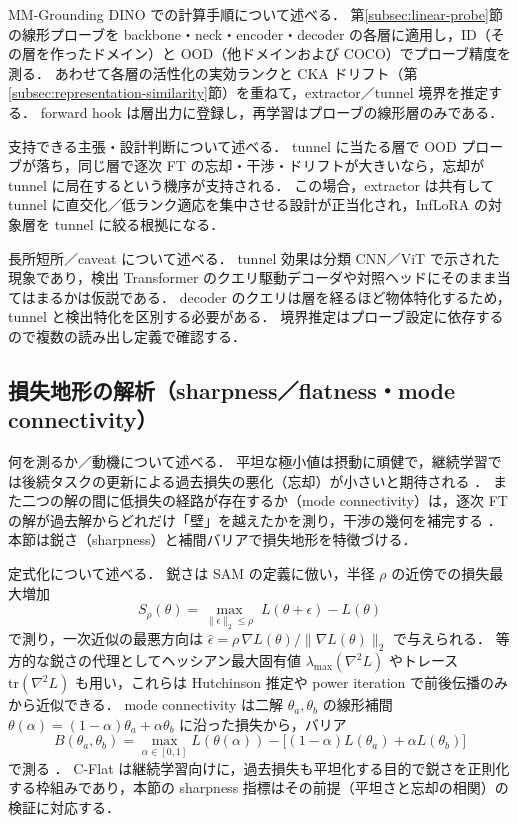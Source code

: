 MM-Grounding DINO での計算手順について述べる．
第\ref{subsec:linear-probe}節の線形プローブを backbone・neck・encoder・decoder の各層に適用し，ID（その層を作ったドメイン）と OOD（他ドメインおよび COCO）でプローブ精度を測る．
あわせて各層の活性化の実効ランクと CKA ドリフト（第\ref{subsec:representation-similarity}節）を重ねて，extractor／tunnel 境界を推定する．
forward hook は層出力に登録し，再学習はプローブの線形層のみである．

支持できる主張・設計判断について述べる．
tunnel に当たる層で OOD プローブが落ち，同じ層で逐次 FT の忘却・干渉・ドリフトが大きいなら，忘却が tunnel に局在するという機序が支持される．
この場合，extractor は共有して tunnel に直交化／低ランク適応を集中させる設計が正当化され，InfLoRA の対象層を tunnel に絞る根拠になる．

長所短所／caveat について述べる．
tunnel 効果は分類 CNN／ViT で示された現象であり，検出 Transformer のクエリ駆動デコーダや対照ヘッドにそのまま当てはまるかは仮説である．
decoder のクエリは層を経るほど物体特化するため，tunnel と検出特化を区別する必要がある．
境界推定はプローブ設定に依存するので複数の読み出し定義で確認する．


\subsection{損失地形の解析（sharpness／flatness・mode connectivity）}
\label{subsec:loss-landscape}

何を測るか／動機について述べる．
平坦な極小値は摂動に頑健で，継続学習では後続タスクの更新による過去損失の悪化（忘却）が小さいと期待される \cite{cflat}．
また二つの解の間に低損失の経路が存在するか（mode connectivity）は，逐次 FT の解が過去解からどれだけ「壁」を越えたかを測り，干渉の幾何を補完する \cite{lmc}．
本節は鋭さ（sharpness）と補間バリアで損失地形を特徴づける．

定式化について述べる．
鋭さは SAM \cite{sam_foret2021} の定義に倣い，半径 $\rho$ の近傍での損失最大増加
\begin{equation}
S_\rho(\theta) = \max_{\|\epsilon\|_2 \leq \rho}\; L(\theta + \epsilon) - L(\theta)
\end{equation}
で測り，一次近似の最悪方向は $\hat{\epsilon} = \rho\, \nabla L(\theta) / \| \nabla L(\theta) \|_2$ で与えられる．
等方的な鋭さの代理としてヘッシアン最大固有値 $\lambda_{\max}(\nabla^2 L)$ やトレース $\mathrm{tr}(\nabla^2 L)$ も用い，これらは Hutchinson 推定や power iteration で前後伝播のみから近似できる．
mode connectivity は二解 $\theta_a, \theta_b$ の線形補間 $\theta(\alpha) = (1-\alpha)\theta_a + \alpha\theta_b$ に沿った損失から，バリア
\begin{equation}
B(\theta_a, \theta_b) = \max_{\alpha \in [0,1]} L(\theta(\alpha)) - \big[(1-\alpha) L(\theta_a) + \alpha L(\theta_b)\big]
\end{equation}
で測る \cite{lmc}．
C-Flat \cite{cflat} は継続学習向けに，過去損失も平坦化する目的で鋭さを正則化する枠組みであり，本節の sharpness 指標はその前提（平坦さと忘却の相関）の検証に対応する．

